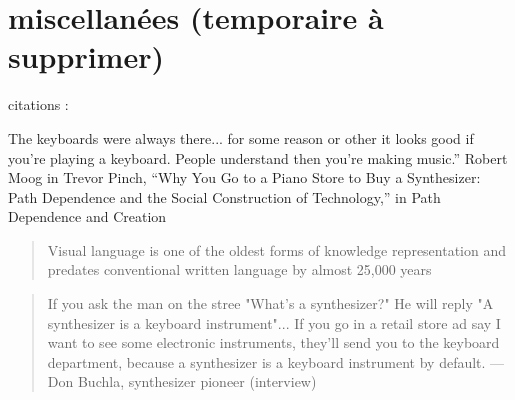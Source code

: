 \blindtext
\blindtext

\blindtext

\section*{miscellanées (temporaire à supprimer)}
citations :

The  keyboards  were  always  there...  for  some  reason  or  other  it  looks  good  if  you’re playing a keyboard. People understand then you’re making music.” Robert Moog in Trevor Pinch, “Why You Go to a Piano Store to Buy a Synthesizer: Path Dependence and the Social Construction of Technology,” in Path Dependence and Creation



\begin{quote}
Visual language is one of the oldest forms of knowledge representation and predates conventional written language by almost 25,000 years
\end{quote}
\cite{tufte_visual_2001}

\cite{moody_physics_2009}


\begin{quotation}
If you ask the man on the stree "What's a synthesizer?" He will reply "A synthesizer is a keyboard instrument"... If you go in a retail store ad say I want to see some electronic instruments, they'll send you to the keyboard department, because a synthesizer is a keyboard instrument by default. — Don Buchla, synthesizer pioneer (interview)
\end{quotation}
\cite{pinch_why_2001}